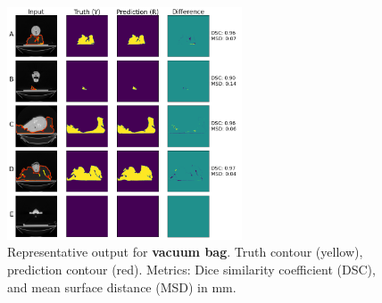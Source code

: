 \documentclass[9pt]{beamer}
\begin{document}
  \begin{frame}{}
\begin{figure}
\includegraphics[width=0.62\textwidth]{images/vet_vacbag}
\caption{Representative output for \textbf{vacuum bag}. Truth contour (yellow),
  prediction contour (red). Metrics: Dice similarity coefficient (DSC), and mean
  surface distance (MSD) in mm.}
\end{figure}
\end{frame}
%
\end{document}
